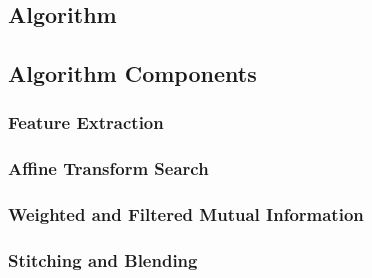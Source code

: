 \documentclass[11pt]{report}
\begin{document}
\begin{doublespace}
\indent






\chapter{Algorithm}

\indent



\section{Algorithm Components}

\indent



\subsection{Feature Extraction}

\indent


\subsection{Affine Transform Search}

\indent



\subsection{Weighted and Filtered Mutual Information}

\indent



\subsection{Stitching and Blending}

\indent




\end{doublespace}
\end{document}
